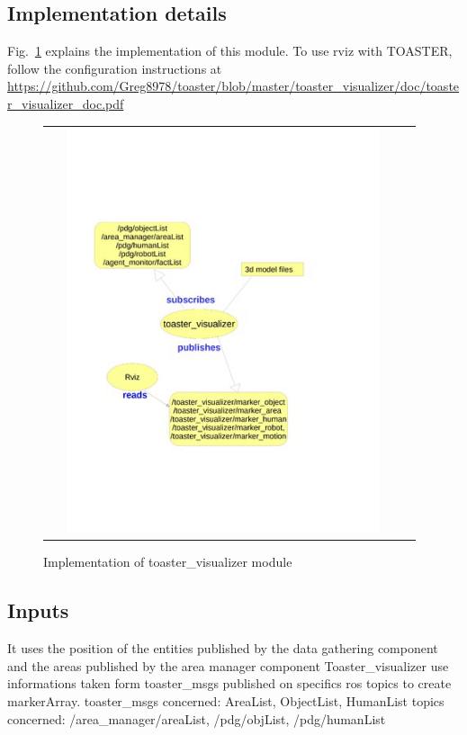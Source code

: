 \documentclass[a4paper]{article}
\begin{document}
\subsection{Implementation details}
Fig.~\ref{fig:visualizer}  explains the implementation of this module. To use rviz with TOASTER, follow the configuration instructions at \url{https://github.com/Greg8978/toaster/blob/master/toaster_visualizer/doc/toaster_visualizer_doc.pdf}
 \begin{figure}[ht!]

 \centering
 \begin{tabular}{cc}
  \includegraphics[width=0.9\textwidth]{img/visualizer.png}
 \end{tabular}
   \vspace{-8pt}
 \caption{Implementation of toaster\_visualizer module}
 \label{fig:visualizer}
  \vspace{-10pt}
 \end{figure}
\subsection{Inputs}
It uses the position of the entities published by the data gathering component and the areas published by the area manager component Toaster\_visualizer use informations taken form toaster\_msgs published on specifics ros topics to create markerArray.
toaster\_msgs concerned: AreaList, ObjectList, HumanList
topics concerned: /area\_manager/areaList, /pdg/objList, /pdg/humanList
\end{document}
